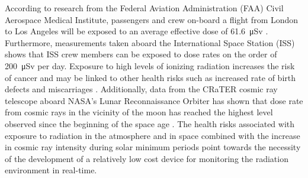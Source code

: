 According to research from the Federal Aviation Administration (FAA) Civil Aerospace Medical Institute, passengers and crew on-board a flight from London to Los Angeles will be exposed to an average effective dose of \SI{61.6}{\micro\sievert} \cite{faa}. Furthermore, measurements taken aboard the International Space Station (ISS) shows that ISS crew members can be exposed to dose rates on the order of \SI{200}{\micro\sievert} per day. Exposure to high levels of ionizing radiation increases the risk of cancer and may be linked to other health risks such as increased rate of birth defects and miscarriages \cite{flightatt}. 
Additionally, data from the CRaTER cosmic ray telescope aboard NASA’s Lunar Reconnaissance Orbiter has shown that dose rate from cosmic rays in the vicinity of the moon has reached the highest level observed since the beginning of the space age \cite{crater}. The health risks associated with exposure to radiation in the atmosphere and in space combined with the increase in cosmic ray intensity during solar minimum periods point towards the necessity of the development of a relatively low cost device for monitoring the radiation environment in real-time.

